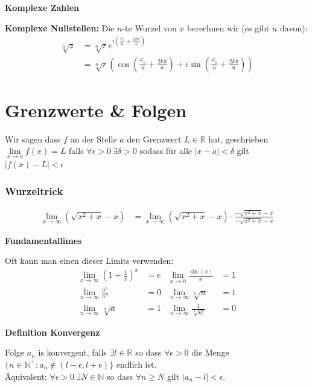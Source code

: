 \documentclass[25pt]{sciposter}
\newcommand{\R}{\mathbb{R}}
\newcommand{\N}{\mathbb{N}}
\newenvironment{method}[1]{\begin{mdframed}[backgroundcolor=blue!10,innertopmargin=15pt, innerbottommargin=15pt, nobreak=true]
		\textbf{#1 }
	}
	{ 
	\end{mdframed}
}
\begin{document}
\begin{multicols}{3}
\begin{method}{Komplexe Zahlen}
\textbf{Komplexe Nullstellen:} Die $n$-te Wurzel von $x$ berechnen wir (es gibt $n$ davon):
\begin{align*}
	\sqrt[n]{z} &= \sqrt[n]{r} e^{i \left( \frac{\varphi_0}{n} + \frac{2k\pi}{n}\right)}\\
	&= \sqrt[n]{r} \left(\cos\left( \frac{\varphi_0}{n} + \frac{2k\pi}{n}\right) + i \sin\left( \frac{\varphi_0}{n} + \frac{2k\pi}{n}\right)\right)
\end{align*}

\end{method}





\section*{Grenzwerte \& Folgen}
Wir sagen dass $f$ an der Stelle $a$ den Grenzwert $L\in \R$ hat, geschrieben $\lim\limits_{x \to a} f(x) = L$ falls $\forall \epsilon > 0 \ \exists \delta > 0 $ sodass für alle $|x-a|<\delta$ gilt $|f(x)-L|< \epsilon$




\subsubsection*{Wurzeltrick}
\begin{align*}
	\lim\limits_{x \to \infty } \left( \sqrt{x^2 + x} -x \right) &= \lim\limits_{x \to \infty } \left( \sqrt{x^2 + x} -x \right)  \cdot \frac{  -\sqrt{x^2 + x} -x  }{ -\sqrt{x^2 + x} -x }
\end{align*}

\begin{method}{Fundamentallimes}
	Oft kann man einen dieser Limits verwenden:
	\begin{align*}
		\lim\limits_{x \to \infty} \left(1 + \frac{1}{x}\right)^x &= e &  \lim\limits_{x \to 0} \frac{\sin(x)}{x} &= 1 \\
		\lim\limits_{n \to \infty} \frac{a^n}{n^n} &= 0 & 	\lim\limits_{n \to \infty} \sqrt[n]{n} &= 1\\
		\lim\limits_{n \to \infty} \sqrt[n]{a} &= 1  & 	\lim\limits_{n \to \infty} \frac{1}{\sqrt[n]{n!}} &= 0
	\end{align*}
\end{method}

\begin{method}{Definition Konvergenz}
Folge $a_n$ is konvergent, falls $\exists l \in \mathbb{R}$ so dass $\forall \epsilon > 0$ die Menge $\{n \in \mathbb{N}^+: a_n \not \in (l-\epsilon, l + \epsilon)\}$ endlich ist. \\
Äquivalent: $\forall \epsilon > 0 \ \exists N \in \N $ so dass $ \forall n \geq N$ gilt $|a_n - l|< \epsilon$.
\end{method}


\end{multicols}
\end{document}
